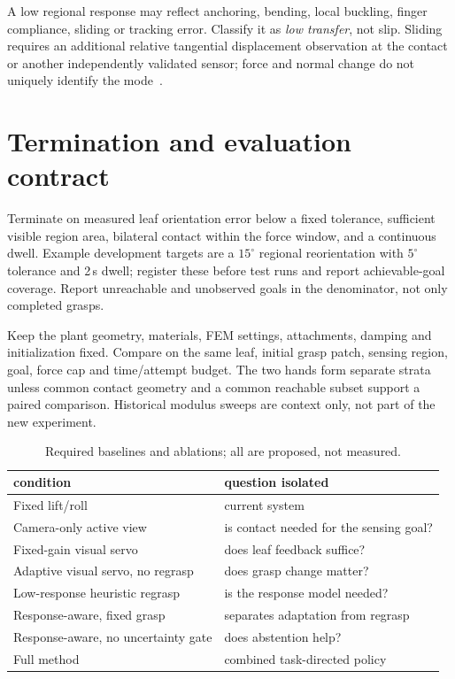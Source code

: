 \documentclass[letterpaper,10pt,conference]{ieeeconf}
\begin{document}
A low regional response may reflect anchoring, bending, local buckling, finger
compliance, sliding or tracking error. Classify it as \emph{low transfer}, not slip.
Sliding requires an additional relative tangential displacement observation at the
contact or another independently validated sensor; force and normal change do not
uniquely identify the mode~\cite{zhou2022}.

\section{Termination and evaluation contract}
Terminate on measured leaf orientation error below a fixed tolerance, sufficient visible
region area, bilateral contact within the force window, and a continuous dwell. Example
development targets are a $15^\circ$ regional reorientation with $5^\circ$ tolerance and
2\,s dwell; register these before test runs and report achievable-goal coverage. Report
unreachable and unobserved goals in the denominator, not only completed grasps.

Keep the plant geometry, materials, FEM settings, attachments, damping and initialization
fixed. Compare on the same leaf, initial grasp patch, sensing region, goal, force cap and
time/attempt budget. The two hands form separate strata unless common contact geometry
and a common reachable subset support a paired comparison. Historical modulus sweeps are
context only, not part of the new experiment.

\begin{table}[h]
\centering\footnotesize
\caption{Required baselines and ablations; all are proposed, not measured.}
\begin{tabular}{@{}ll@{}}
\toprule
condition & question isolated \\
\midrule
Fixed lift/roll & current system \\
Camera-only active view & is contact needed for the sensing goal? \\
Fixed-gain visual servo & does leaf feedback suffice? \\
Adaptive visual servo, no regrasp & does grasp change matter? \\
Low-response heuristic regrasp & is the response model needed? \\
Response-aware, fixed grasp & separates adaptation from regrasp \\
Response-aware, no uncertainty gate & does abstention help? \\
Full method & combined task-directed policy \\
\bottomrule
\end{tabular}
\end{table}
\end{document}
